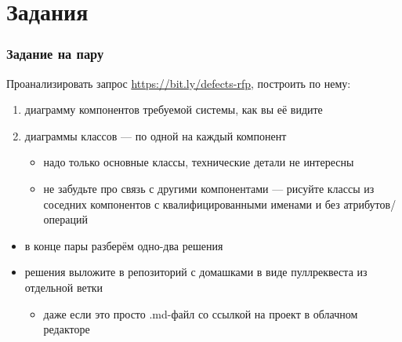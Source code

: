 \documentclass{../cscslides}
\begin{document}
    
    \frame{\titlepage}

    \section{Задания}

    \begin{frame}
        \frametitle{Задание на пару}
        Проанализировать запрос \url{https://bit.ly/defects-rfp}, построить по нему:
        \begin{enumerate}
            \item диаграмму компонентов требуемой системы, как вы её видите
            \item диаграммы классов --- по одной на каждый компонент
            \begin{itemize}
                \item надо только основные классы, технические детали не интересны
                \item не забудьте про связь с другими компонентами --- рисуйте классы из соседних компонентов с квалифицированными именами и без атрибутов/операций
            \end{itemize}
        \end{enumerate}
        \vspace{3mm}
        \begin{itemize}
            \item в конце пары разберём одно-два решения
            \item решения выложите в репозиторий с домашками в виде пуллреквеста из отдельной ветки
            \begin{itemize}
                \item даже если это просто .md-файл со ссылкой на проект в облачном редакторе
            \end{itemize}
        \end{itemize}
    \end{frame}
\end{document}
